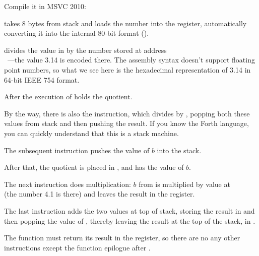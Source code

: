 ﻿

Compile it in MSVC 2010:



\FLD takes 8 bytes from stack and loads the number into the  register, automatically converting 
it into the internal 80-bit format ().


\FDIV divides the value in  by the number stored at address \\
~---the value 3.14 is encoded there. 
The assembly syntax doesn't support floating point numbers, so 
what we see here is the hexadecimal representation of 3.14 in 64-bit IEEE 754 format.

After the execution of \FDIV {} holds the \gls{quotient}.


By the way, there is also the \FDIVP instruction, which divides  by , 
popping both these values from stack and then pushing the result. 
If you know the Forth language\FNURLFORTH,
you can quickly understand that this is a stack machine\FNURLSTACK.

The subsequent \FLD instruction pushes the value of $b$ into the stack.

After that, the quotient is placed in , and  has the value of $b$.


The next \FMUL instruction does multiplication: $b$ from  is multiplied by value at\\
 (the number 4.1 is there) and leaves the result in the  register.


The last \FADDP instruction adds the two values at top of stack, storing the result in  
and then popping the value of , thereby leaving the result at the top of the stack, in .

The function must return its result in the  register, 
so there are no any other instructions except the function epilogue after \FADDP.


